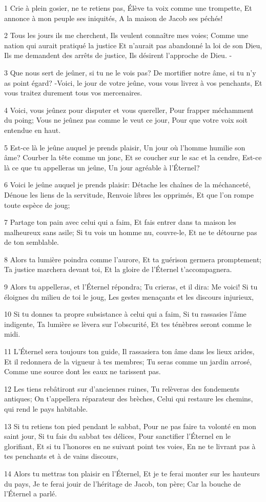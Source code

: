 \par 1 Crie à plein gosier, ne te retiens pas, Élève ta voix comme une trompette, Et annonce à mon peuple ses iniquités, A la maison de Jacob ses péchés!
\par 2 Tous les jours ils me cherchent, Ils veulent connaître mes voies; Comme une nation qui aurait pratiqué la justice Et n'aurait pas abandonné la loi de son Dieu, Ils me demandent des arrêts de justice, Ils désirent l'approche de Dieu. -
\par 3 Que nous sert de jeûner, si tu ne le vois pas? De mortifier notre âme, si tu n'y as point égard? -Voici, le jour de votre jeûne, vous vous livrez à vos penchants, Et vous traitez durement tous vos mercenaires.
\par 4 Voici, vous jeûnez pour disputer et vous quereller, Pour frapper méchamment du poing; Vous ne jeûnez pas comme le veut ce jour, Pour que votre voix soit entendue en haut.
\par 5 Est-ce là le jeûne auquel je prends plaisir, Un jour où l'homme humilie son âme? Courber la tête comme un jonc, Et se coucher sur le sac et la cendre, Est-ce là ce que tu appelleras un jeûne, Un jour agréable à l'Éternel?
\par 6 Voici le jeûne auquel je prends plaisir: Détache les chaînes de la méchanceté, Dénoue les liens de la servitude, Renvoie libres les opprimés, Et que l'on rompe toute espèce de joug;
\par 7 Partage ton pain avec celui qui a faim, Et fais entrer dans ta maison les malheureux sans asile; Si tu vois un homme nu, couvre-le, Et ne te détourne pas de ton semblable.
\par 8 Alors ta lumière poindra comme l'aurore, Et ta guérison germera promptement; Ta justice marchera devant toi, Et la gloire de l'Éternel t'accompagnera.
\par 9 Alors tu appelleras, et l'Éternel répondra; Tu crieras, et il dira: Me voici! Si tu éloignes du milieu de toi le joug, Les gestes menaçants et les discours injurieux,
\par 10 Si tu donnes ta propre subsistance à celui qui a faim, Si tu rassasies l'âme indigente, Ta lumière se lèvera sur l'obscurité, Et tes ténèbres seront comme le midi.
\par 11 L'Éternel sera toujours ton guide, Il rassasiera ton âme dans les lieux arides, Et il redonnera de la vigueur à tes membres; Tu seras comme un jardin arrosé, Comme une source dont les eaux ne tarissent pas.
\par 12 Les tiens rebâtiront sur d'anciennes ruines, Tu relèveras des fondements antiques; On t'appellera réparateur des brèches, Celui qui restaure les chemins, qui rend le pays habitable.
\par 13 Si tu retiens ton pied pendant le sabbat, Pour ne pas faire ta volonté en mon saint jour, Si tu fais du sabbat tes délices, Pour sanctifier l'Éternel en le glorifiant, Et si tu l'honores en ne suivant point tes voies, En ne te livrant pas à tes penchants et à de vains discours,
\par 14 Alors tu mettras ton plaisir en l'Éternel, Et je te ferai monter sur les hauteurs du pays, Je te ferai jouir de l'héritage de Jacob, ton père; Car la bouche de l'Éternel a parlé.

